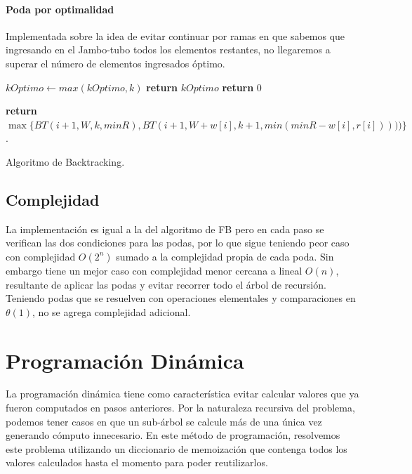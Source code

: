 \documentclass[10pt,a4paper]{article}
\begin{document}
\paragraph{Poda por optimalidad}
Implementada sobre la idea de evitar continuar por ramas en que sabemos que ingresando en el Jambo-tubo todos los elementos restantes, no llegaremos a superar el número de elementos ingresados óptimo.

\begin{algorithm}
	\begin{algorithmic}[1]

				\State $kOptimo \leftarrow max(kOptimo, k)$
				\State \textbf{return} $kOptimo$
			\Else	
				\State \textbf{return} $0$
			\EndIf
		\EndIf
		
		\EndIf
		
		\EndIf
		
		\State \textbf{return} $\max \{ BT(i+1, W, k, minR), BT(i+1, W+w[i], k+1, min(minR - w[i], r[i])))) \}$.
		
		\EndFunction
	\end{algorithmic}
	\caption{Algoritmo de Backtracking.}
	\label{alg:backtracking}
\end{algorithm}

\subsection{Complejidad}
La implementación es igual a la del algoritmo de FB pero en cada paso se verifican las dos condiciones para las podas, por lo que sigue teniendo peor caso con complejidad $O(2^n)$ sumado a la complejidad propia de cada poda. Sin embargo tiene un mejor caso con complejidad menor cercana a lineal $O(n)$, resultante de aplicar las podas y evitar recorrer todo el árbol de recursión. Teniendo podas que se resuelven con operaciones elementales y comparaciones en $\theta(1)$, no se agrega complejidad adicional.

\section{Programación Dinámica} \label{sec:dp}
La programación dinámica tiene como característica evitar calcular valores que ya fueron computados en pasos anteriores. Por la naturaleza recursiva del problema, podemos tener casos en que un sub-árbol se calcule más de una única vez generando cómputo innecesario. En este método de programación, resolvemos este problema utilizando un diccionario de memoización que contenga todos los valores calculados hasta el momento para poder reutilizarlos.
\end{document}
